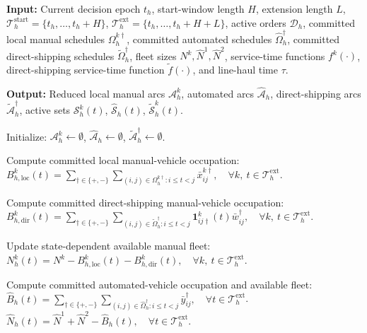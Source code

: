 \documentclass[10pt, reqno]{amsart}
\begin{document}
\begin{algorithm}[!t]
\caption{Rolling-horizon-aware candidate arc generation}
\label{alg:rha can gen}
\begin{algorithmic}[1]

\Statex \textbf{Input:} Current decision epoch $t_h$, start-window length $H$,
extension length $L$, 
$\mathcal{T}_h^{\mathrm{start}}=\{t_h,\ldots,t_h+H\}$,
$\mathcal{T}_h^{\mathrm{ext}}=\{t_h,\ldots,t_h+H+L\}$,
active orders $\mathcal{D}_h$,
committed local manual schedules $\Omega_h^{k\dagger}$,
committed automated schedules $\widehat{\Omega}_h^\dagger$,
committed direct-shipping schedules $\widetilde{\Omega}_h^\dagger$,
fleet sizes $N^k,\widehat N^1,\widehat N^2$, service-time functions
$f^k(\cdot)$, direct-shipping service-time function $\widetilde f(\cdot)$,
and line-haul time $\tau$.

\Statex \textbf{Output:} Reduced local manual arcs $\mathcal{A}_h^k$,
automated arcs $\widehat{\mathcal{A}}_h$,
direct-shipping arcs $\widetilde{\mathcal{A}}_h^\dagger$,
active sets $\mathcal{S}_h^k(t)$, $\widehat{\mathcal{S}}_h(t)$,
$\widetilde{\mathcal{S}}_h^k(t)$.

\State Initialize: 
$\mathcal{A}_h^k \leftarrow \emptyset$, 
$\widehat{\mathcal{A}}_h \leftarrow \emptyset$, 
$\widetilde{\mathcal{A}}_h^\dagger \leftarrow \emptyset$.

\State Compute committed local manual-vehicle occupation:
\Statex \quad
$B_{h,\mathrm{loc}}^k(t)
=
\sum_{\dagger\in\{+,-\}}
\sum_{(i,j)\in\Omega_h^{k\dagger}:i\le t<j}
\bar x_{ij}^{k\dagger},
\quad
\forall k,\ t\in\mathcal{T}_h^{\mathrm{ext}}$.

\State Compute committed direct-shipping manual-vehicle occupation:
\Statex \quad
$B_{h,\mathrm{dir}}^k(t)
=
\sum_{\dagger\in\{+,-\}}
\sum_{(i,j)\in\widetilde{\Omega}_h^\dagger:i\le t<j}
\mathbf{1}_{ij\dagger}^k(t)\bar w_{ij}^{\dagger},
\quad
\forall k,\ t\in\mathcal{T}_h^{\mathrm{ext}}$.

\State Update state-dependent available manual fleet:
\Statex \quad
$N_h^k(t)
=
N^k
-
B_{h,\mathrm{loc}}^k(t)
-
B_{h,\mathrm{dir}}^k(t),
\quad
\forall k,\ t\in\mathcal{T}_h^{\mathrm{ext}}$.

\State Compute committed automated-vehicle occupation and available fleet:
\Statex \quad
$\widehat B_h(t)
=
\sum_{\dagger\in\{+,-\}}
\sum_{(i,j)\in\widehat\Omega_h^\dagger:i\le t<j}
\bar y_{ij}^{\dagger},
\quad
\forall t\in\mathcal{T}_h^{\mathrm{ext}}$.
\Statex \quad
$\widehat N_h(t)
=
\widehat N^1+\widehat N^2-\widehat B_h(t),
\quad
\forall t\in\mathcal{T}_h^{\mathrm{ext}}$.


\end{algorithmic}
\end{algorithm}
\end{document}
